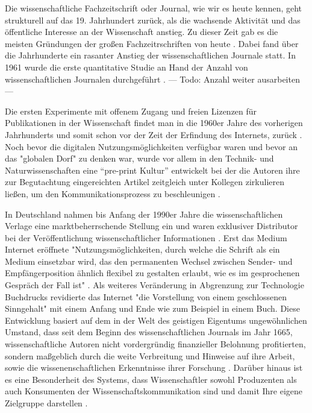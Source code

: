 Die wissenschaftliche Fachzeitschrift oder Journal, wie wir es heute kennen, geht strukturell auf das 19. Jahrhundert zurück, als die wachsende Aktivität und das öffentliche Interesse an der Wissenschaft anstieg. Zu dieser Zeit gab es die meisten Gründungen der großen Fachzeitrschriften von heute \cite{porter_1964_scientific}. Dabei fand über die Jahrhunderte ein rasanter Anstieg der wissenschaftlichen Journale statt. In 1961 wurde die erste quantitative Studie an Hand der Anzahl von wissenschaftlichen Journalen durchgeführt \cite{de_1982_little}. --- Todo: Anzahl weiter ausarbeiten ---

Die ersten Experimente mit offenem Zugang und freien Lizenzen für Publikationen in der Wissenschaft findet man in die 1960er Jahre des vorherigen Jahrhunderts und somit schon vor der Zeit der Erfindung des Internets, zurück \cite{cite:18b}. Noch bevor die digitalen Nutzungsmöglichkeiten verfügbar waren und bevor an das "globalen Dorf"\cite{mcluhan_1962_gutenberg} zu denken war, wurde vor allem in den Technik- und Naturwissenschaften eine “pre-print Kultur” entwickelt bei der die Autoren ihre zur Begutachtung eingereichten Artikel zeitgleich unter Kollegen zirkulieren ließen, um den Kommunikationsprozess zu beschleunigen \cite{suchen-Hoffmann-Zugang-undVerwertung-öffentlicher-Informationen}.

In Deutschland nahmen bis Anfang der 1990er Jahre die wissenschaftlichen Verlage eine marktbeherrschende Stellung ein und waren exklusiver Distributor bei der Veröffentlichung wissenschaftlicher Informationen \cite{schloegl_2005} \cite{offhaus_2012_institutionelle_repos}. Erst das Medium Internet eröffnete "Nutzungsmöglichkeiten, durch welche die Schrift als ein Medium einsetzbar wird, das den permanenten Wechsel zwischen Sender- und Empfängerposition ähnlich flexibel zu gestalten erlaubt, wie es im gesprochenen Gespräch der Fall ist" \cite{sandbothe_2000_pragmatische}. Als weiteres Veränderung in Abgrenzung zur Technologie Buchdrucks revidierte das Internet "die Vorstellung von einem geschlossenen Sinngehalt" \cite{sandbothe_2000_pragmatische} mit einem Anfang und Ende wie zum Beispiel in einem Buch. Diese Entwicklung basiert auf dem in der Welt des geistigen Eigentums ungewöhnlichen Umstand, dass seit dem Beginn des wissenschaftlichen Journals im Jahr 1665, wissenschaftliche Autoren nicht vordergründig finanzieller Belohnung profitierten, sondern maßgeblich durch die weite Verbreitung und Hinweise auf ihre Arbeit, sowie die wissenenschaftlichen Erkenntnisse ihrer Forschung \cite{albert_2006_open_implications}. Darüber hinaus ist es eine Besonderheit des Systems, dass Wissenschaftler sowohl Produzenten als auch Konsumenten der Wissenschaftskommunikation sind und damit Ihre eigene Zielgruppe darstellen \cite{Hess_2006}.

